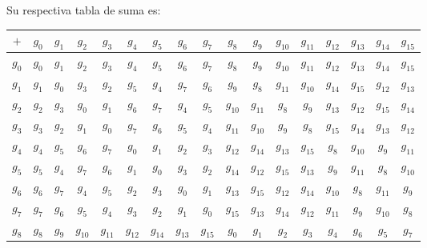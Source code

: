 \documentclass[letterpaper,10pt]{article}
\begin{document}
\begin{enumerate}
    
    Su respectiva tabla de suma es:
    \begin{table}[h]
    \begin{center}
    \begin{tabular}{|c|c|c|c|c|c|c|c|c|c|c|c|c|c|c|c|c|}
    \hline
    $+$ & $g_{0}$ & $g_{1}$ & $g_{2}$ & $g_{3}$ & $g_{4}$ & $g_{5}$ & $g_{6}$ &
    $g_{7}$ & $g_{8}$ & $g_{9}$ & $g_{10}$ & $g_{11}$ & $g_{12}$ & $g_{13}$ &
    $g_{14}$ & $g_{15}$ \\ \hline
    $g_{0}$ & $g_{0}$ & $g_{1}$ & $g_{2}$ & $g_{3}$ & $g_{4}$ & $g_{5}$ & 
    $g_{6}$ & $g_{7}$ & $g_{8}$ & $g_{9}$ & $g_{10}$ & $g_{11}$ & $g_{12}$ & 
    $g_{13}$ & $g_{14}$ & $g_{15}$  \\ \hline
    $g_{1}$ & $g_{1}$ & $g_{0}$ & $g_{3}$ & $g_{2}$ & $g_{5}$ & $g_{4}$ &  
    $g_{7}$ & $g_{6}$ & $g_{9}$ & $g_{8}$ & $g_{11}$ & $g_{10}$ & $g_{14}$ & 
    $g_{15}$ & $g_{12}$ & $g_{13}$\\ \hline
    $g_{2}$ & $g_{2}$ & $g_{3}$ & $g_{0}$ & $g_{1}$ & $g_{6}$ & $g_{7}$ &
    $g_{4}$ & $g_{5}$ & $g_{10}$ & $g_{11}$ & $g_{8}$ & $g_{9}$ & $g_{13}$ &
    $g_{12}$ & $g_{15}$ & $g_{14}$ \\ \hline
    $g_{3}$ & $g_{3}$ & $g_{2}$ & $g_{1}$ & $g_{0}$ & $g_{7}$ & $g_{6}$ &
    $g_{5}$ & $g_{4}$ & $g_{11}$ & $g_{10}$ & $g_{9}$ & $g_{8}$ & $g_{15}$ &
    $g_{14}$ & $g_{13}$ & $g_{12}$ \\ \hline
    $g_{4}$ & $g_{4}$ & $g_{5}$ & $g_{6}$ & $g_{7}$ & $g_{0}$ & $g_{1}$ &
    $g_{2}$ & $g_{3}$ & $g_{12}$ & $g_{14}$ & $g_{13}$ & $g_{15}$ & $g_{8}$ & 
    $g_{10}$ & $g_{9}$ & $g_{11}$ \\ \hline
    $g_{5}$ & $g_{5}$ & $g_{4}$ & $g_{7}$ & $g_{6}$ & $g_{1}$ & $g_{0}$ & 
    $g_{3}$ & $g_{2}$ & $g_{14}$ & $g_{12}$ & $g_{15}$ & $g_{13}$ & $g_{9}$ &
    $g_{11}$ & $g_{8}$ & $g_{10}$ \\ \hline
    $g_{6}$ & $g_{6}$ & $g_{7}$ & $g_{4}$ & $g_{5}$ & $g_{2}$ & $g_{3}$ & 
    $g_{0}$ & $g_{1}$ & $g_{13}$ & $g_{15}$ & $g_{12}$ & $g_{14}$ & $g_{10}$ & 
    $g_{8}$ & $g_{11}$ & $g_{9}$ \\ \hline
    $g_{7}$ & $g_{7}$ & $g_{6}$ & $g_{5}$ & $g_{4}$ & $g_{3}$ & $g_{2}$ &  
    $g_{1}$ & $g_{0}$ & $g_{15}$ & $g_{13}$ & $g_{14}$ & $g_{12}$ & $g_{11}$ &
    $g_{9}$ & $g_{10}$ & $g_{8}$ \\ \hline
    $g_{8}$ & $g_{8}$ & $g_{9}$ & $g_{10}$ & $g_{11}$ & $g_{12}$ & $g_{14}$ &  
    $g_{13}$ & $g_{15}$ & $g_{0}$ & $g_{1}$ & $g_{2}$ & $g_{3}$ & $g_{4}$ &
    $g_{6}$ & $g_{5}$ & $g_{7}$ \\ \hline

\end{tabular}
\end{center}
\end{table}
\end{enumerate}
\end{document}
